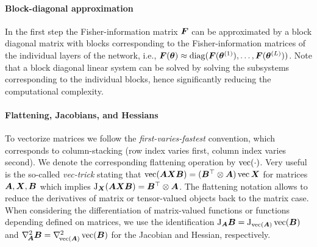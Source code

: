 \paragraph{Block-diagonal approximation}
In the first step the Fisher-information matrix ${\bm{F}}$ can be approximated by a block diagonal matrix with blocks corresponding to the Fisher-information matrices of the individual layers of the network, i.e., ${\bm{F}}({\bm{\theta}}) \approx \operatorname{diag}({\bm{F}}({\bm{\theta}}^{(1)}), \dots, {\bm{F}}({\bm{\theta}}^{(L)}))$. 
Note that a block diagonal linear system can be solved by solving the subsystems corresponding to the individual blocks, hence significantly reducing the computational complexity. 

\paragraph{Flattening, Jacobians, and Hessians}
To vectorize %
matrices %
we follow the %
\emph{first-varies-fastest} convention, which corresponds to column-stacking (row index varies first, column index varies second).
We denote the corresponding flattening operation by $\operatorname{vec}(\cdot)$.
Very useful is the so-called \emph{vec-trick} stating that $\operatorname{vec}({\bm{A}}{\bm{X}}{\bm{B}}) = ({\bm{B}}^\top\otimes {\bm{A}})\operatorname{vec}{{\bm{X}}}$
for matrices ${\bm{A}}, {\bm{X}}, {\bm{B}}$ %
which implies $\mathrm{J}_{\bm{X}}({\bm{A}}{\bm{X}}{\bm{B}}) = {\bm{B}}^\top\otimes {\bm{A}}$.
The flattening notation allows to reduce the derivatives of matrix or tensor-valued objects back to the matrix case.
When considering the differentiation of matrix-valued functions or functions depending defined on matrices, we use the identification $\mathrm{J}_{{\bm{A}}} {\bm{B}} = \mathrm{J}_{\operatorname{vec}( {\bm{A}} )}\operatorname{vec}({\bm{B}})$ and $\nabla_{\!{{\bm{A}}}}^{2}{\bm{B}} = \nabla_{\!{\operatorname{vec}({\bm{A}})}}^{2} \operatorname{vec}({\bm{B}})$ for the Jacobian and Hessian, respectively. 

